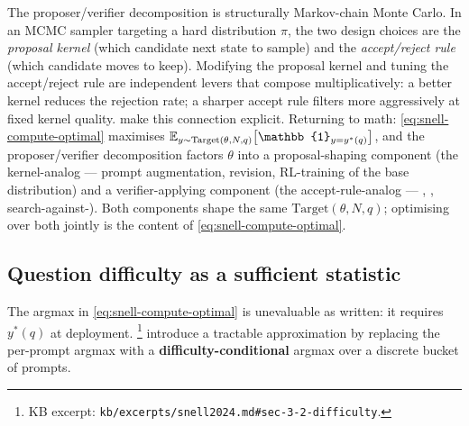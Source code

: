 \begin{analogy}
The proposer/verifier decomposition is structurally Markov-chain Monte
Carlo. In an MCMC sampler targeting a hard distribution $\pi$, the two
design choices are the \emph{proposal kernel} (which candidate next
state to sample) and the \emph{accept/reject rule} (which candidate
moves to keep). Modifying the proposal kernel and tuning the
accept/reject rule are independent levers that compose multiplicatively:
a better kernel reduces the rejection rate; a sharper accept rule
filters more aggressively at fixed kernel quality. \citet[\S 2]{snell2024}
make this connection explicit.
Returning to math:
\cref{eq:snell-compute-optimal} maximises
$\E_{y \sim \mathrm{Target}(\theta,N,q)}\!\left[\mathbb{1}_{y=y^\ast(q)}\right]$,
and the proposer/verifier decomposition factors $\theta$ into a
proposal-shaping component (the kernel-analog --- prompt augmentation,
revision, RL-training of the base distribution) and a verifier-applying
component (the accept-rule-analog --- , , search-against-).
Both components shape the same $\mathrm{Target}(\theta, N, q)$;
optimising over both jointly is the content of \cref{eq:snell-compute-optimal}.
\end{analogy}

\subsection{Question difficulty as a sufficient statistic}
\label{sec:snell-difficulty}

The argmax in \cref{eq:snell-compute-optimal} is unevaluable as written:
it requires $y^\ast(q)$ at deployment. \citet[\S 3.2]{snell2024}%
\footnote{KB excerpt: \texttt{kb/excerpts/snell2024.md\#sec-3-2-difficulty}.}
introduce a tractable approximation by replacing the per-prompt argmax
with a \textbf{difficulty-conditional} argmax over a discrete bucket of
prompts.

